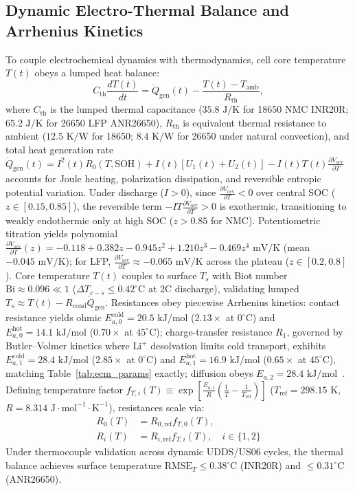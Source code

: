 \documentclass[preprint,12pt]{elsarticle}
\begin{document}
\subsection{Dynamic Electro-Thermal Balance and Arrhenius Kinetics}
To couple electrochemical dynamics with thermodynamics, cell core temperature $T(t)$ obeys a lumped heat balance:
\begin{equation}\label{eqn:thermal_balance}
C_{\text{th}} \frac{d T(t)}{dt} = \dot{Q}_{\text{gen}}(t) - \frac{T(t) - T_{\text{amb}}}{R_{\text{th}}},
\end{equation}
where $C_{\text{th}}$ is the lumped thermal capacitance ($35.8\text{ J/K}$ for 18650 NMC INR20R; $65.2\text{ J/K}$ for 26650 LFP ANR26650), $R_{\text{th}}$ is equivalent thermal resistance to ambient ($12.5\text{ K/W}$ for 18650; $8.4\text{ K/W}$ for 26650 under natural convection), and total heat generation rate $\dot{Q}_{\text{gen}}(t) = I^2(t) R_0(T, \text{SOH}) + I(t)[U_1(t) + U_2(t)] - I(t) T(t) \frac{\partial V_{\text{ocv}}}{\partial T}$ accounts for Joule heating, polarization dissipation, and reversible entropic potential variation. Under discharge ($I > 0$), since $\frac{\partial V_{\text{ocv}}}{\partial T} < 0$ over central SOC ($z \in [0.15, 0.85]$), the reversible term $-I T \frac{\partial V_{\text{ocv}}}{\partial T} > 0$ is exothermic, transitioning to weakly endothermic only at high SOC ($z > 0.85$ for NMC). Potentiometric titration yields polynomial $\frac{\partial V_{\text{ocv}}}{\partial T}(z) = -0.118 + 0.382 z - 0.945 z^2 + 1.210 z^3 - 0.469 z^4\text{ mV/K}$ (mean $-0.045\text{ mV/K}$); for LFP, $\frac{\partial V_{\text{ocv}}}{\partial T} \approx -0.065\text{ mV/K}$ across the plateau ($z \in [0.2, 0.8]$). Core temperature $T(t)$ couples to surface $T_s$ with Biot number $\text{Bi} \approx 0.096 \ll 1$ ($\Delta T_{c-s} \le 0.42^\circ\text{C}$ at 2C discharge), validating lumped $T_s \approx T(t) - R_{\text{cond}}\dot{Q}_{\text{gen}}$. Resistances obey piecewise Arrhenius kinetics: contact resistance yields ohmic $E_{a,0}^{\text{cold}} = 20.5\text{ kJ/mol}$ ($2.13\times$ at $0^\circ\text{C}$) and $E_{a,0}^{\text{hot}} = 14.1\text{ kJ/mol}$ ($0.70\times$ at $45^\circ\text{C}$); charge-transfer resistance $R_1$, governed by Butler--Volmer kinetics where $\text{Li}^+$ desolvation limits cold transport, exhibits $E_{a,1}^{\text{cold}} = 28.4\text{ kJ/mol}$ ($2.85\times$ at $0^\circ\text{C}$) and $E_{a,1}^{\text{hot}} = 16.9\text{ kJ/mol}$ ($0.65\times$ at $45^\circ\text{C}$), matching Table~\ref{tab:ecm_params} exactly; diffusion obeys $E_{a,2} = 28.4\text{ kJ/mol}$~\cite{He2011ecm,Ren2019aging}. Defining temperature factor $f_{T,i}(T) \equiv \exp[\frac{E_{a,i}}{R}(\frac{1}{T} - \frac{1}{T_{\text{ref}}})]$ ($T_{\text{ref}} = 298.15\text{ K}$, $R = 8.314\text{ J}\cdot\text{mol}^{-1}\cdot\text{K}^{-1}$), resistances scale via:
\begin{align}
R_0(T) &= R_{0,\text{ref}} f_{T,0}(T), \label{eqn:arrh_r0}\\
R_i(T) &= R_{i,\text{ref}} f_{T,i}(T), \quad i \in \{1, 2\} \label{eqn:arrh_ri}
\end{align}
Under thermocouple validation across dynamic UDDS/US06 cycles, the thermal balance achieves surface temperature $\text{RMSE}_T \le 0.38^\circ\text{C}$ (INR20R) and $\le 0.31^\circ\text{C}$ (ANR26650).
\end{document}
